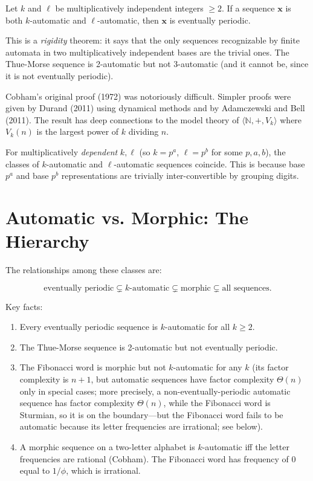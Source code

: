 \begin{theorem}[Cobham 1969]
Let $k$ and $\ell$ be multiplicatively independent integers $\geq 2$. If a sequence $\mathbf{x}$ is both $k$-automatic and $\ell$-automatic, then $\mathbf{x}$ is eventually periodic.

This is a \textit{rigidity} theorem: it says that the only sequences recognizable by finite automata in two multiplicatively independent bases are the trivial ones. The Thue-Morse sequence is 2-automatic but not 3-automatic (and it cannot be, since it is not eventually periodic).

Cobham's original proof (1972) was notoriously difficult. Simpler proofs were given by Durand (2011) using dynamical methods and by Adamczewski and Bell (2011). The result has deep connections to the model theory of $\langle \mathbb{N}, +, V_k \rangle$ where $V_k(n)$ is the largest power of $k$ dividing $n$.
\end{theorem}

\begin{remark}
For multiplicatively \textit{dependent} $k, \ell$ (so $k = p^a$, $\ell = p^b$ for some $p, a, b$), the classes of $k$-automatic and $\ell$-automatic sequences coincide. This is because base $p^a$ and base $p^b$ representations are trivially inter-convertible by grouping digits.
\end{remark}



\section{Automatic vs. Morphic: The Hierarchy}

The relationships among these classes are:

\[\text{eventually periodic} \subsetneq k\text{-automatic} \subsetneq \text{morphic} \subsetneq \text{all sequences}.\]

Key facts:
\begin{enumerate}
\item Every eventually periodic sequence is $k$-automatic for all $k \geq 2$.
\item The Thue-Morse sequence is 2-automatic but not eventually periodic.
\item The Fibonacci word is morphic but not $k$-automatic for any $k$ (its factor complexity is $n+1$, but automatic sequences have factor complexity $\Theta(n)$ only in special cases; more precisely, a non-eventually-periodic automatic sequence has factor complexity $\Theta(n)$, while the Fibonacci word is Sturmian, so it is on the boundary---but the Fibonacci word fails to be automatic because its letter frequencies are irrational; see below).
\item A morphic sequence on a two-letter alphabet is $k$-automatic iff the letter frequencies are rational (Cobham). The Fibonacci word has frequency of $0$ equal to $1/\phi$, which is irrational.
\end{enumerate}



